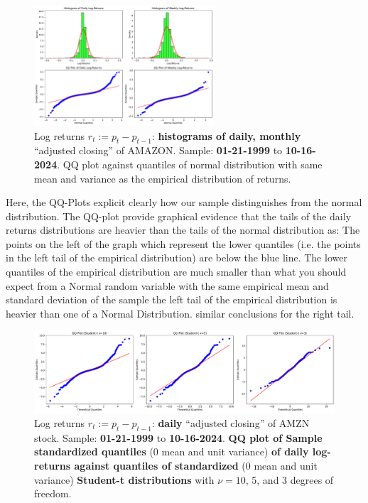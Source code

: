 \documentclass{article}
\begin{document}
\begin{figure}[H]
    \centering
    \includegraphics[width=0.6\textwidth]{Img/QQplot_daily_weekly_AMZN.pdf}
    \caption{Log returns $r_t := p_t - p_{t-1}$: \textbf{histograms of daily, monthly} “adjusted closing” of AMAZON. 
    Sample: \textbf{01-21-1999} to \textbf{10-16-2024}. QQ plot against quantiles of normal distribution with same mean and variance as the empirical distribution of returns.}
    \label{fig:Hstogram_QQ_plot}
\end{figure}

\noindent Here, the QQ-Plots explicit clearly how our sample distinguishes from the normal distribution. 
The QQ-plot provide graphical evidence that the tails of the daily returns distributions are heavier than the tails of the normal distribution as: The points on the left of the graph which represent the lower quantiles (i.e. the points in the left tail of the empirical distribution) are below the blue line. The lower quantiles of the empirical distribution are much smaller than what you should expect from a Normal random variable with the same empirical mean and standard deviation of the sample the left tail of the empirical distribution is heavier than one of a Normal Distribution. similar conclusions for the right tail.
\begin{figure}[H]
    \centering
    \includegraphics[width=1\textwidth]{Img/qqplt_tstudents_AMZNdaily.pdf}
    \caption{Log returns $r_t := p_t - p_{t-1}$: \textbf{daily} “adjusted closing” of AMZN stock. 
    Sample: \textbf{01-21-1999} to \textbf{10-16-2024}. \textbf{QQ plot of Sample standardized quantiles} (0 mean and unit variance) \textbf{of daily log-returns against quantiles of standardized} (0 mean and unit variance) \textbf{Student-t distributions} with $\nu = 10$, 5, and 3 degrees of freedom.}
    \label{fig:Hstogram_QQ_plot}
\end{figure}
\end{document}
